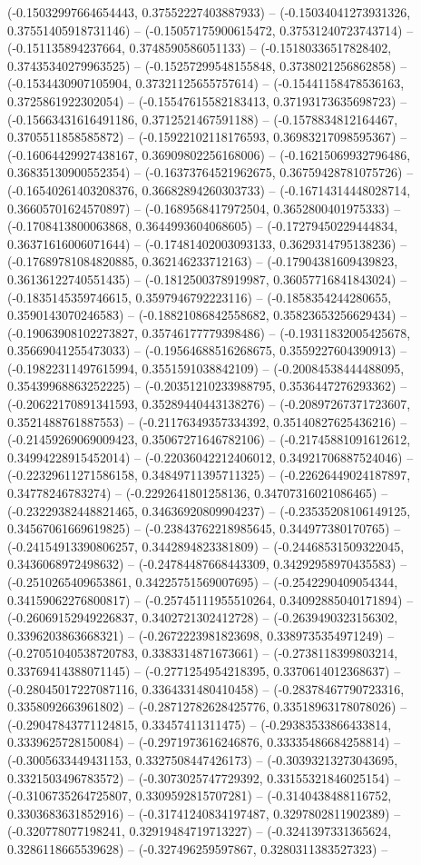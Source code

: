 (-0.15032997664654443, 0.37552227403887933) -- (-0.15034041273931326, 0.37551405918731146) -- (-0.15057175900615472, 0.37531240723743714) -- (-0.151135894237664, 0.3748590586051133) -- (-0.15180336517828402, 0.37435340279963525) -- (-0.15257299548155848, 0.3738021256862858) -- (-0.1534430907105904, 0.37321125655757614) -- (-0.15441158478536163, 0.3725861922302054) -- (-0.15547615582183413, 0.37193173635698723) -- (-0.15663431616491186, 0.3712521467591188) -- (-0.1578834812164467, 0.3705511858585872) -- (-0.15922102118176593, 0.36983217098595367) -- (-0.16064429927438167, 0.36909802256168006) -- (-0.16215069932796486, 0.36835130900552354) -- (-0.16373764521962675, 0.36759428781075726) -- (-0.16540261403208376, 0.36682894260303733) -- (-0.16714314448028714, 0.36605701624570897) -- (-0.1689568417972504, 0.3652800401975333) -- (-0.1708413800063868, 0.3644993604068605) -- (-0.17279450229444834, 0.36371616006071644) -- (-0.17481402003093133, 0.3629314795138236) -- (-0.17689781084820885, 0.362146233712163) -- (-0.17904381609439823, 0.36136122740551435) -- (-0.1812500378919987, 0.36057716841843024) -- (-0.1835145359746615, 0.3597946792223116) -- (-0.1858354244280655, 0.3590143070246583) -- (-0.18821086842558682, 0.35823653256629434) -- (-0.19063908102273827, 0.35746177779398486) -- (-0.19311832005425678, 0.35669041255473033) -- (-0.19564688516268675, 0.3559227604390913) -- (-0.19822311497615994, 0.3551591038842109) -- (-0.20084538444488095, 0.35439968863252225) -- (-0.20351210233988795, 0.3536447276293362) -- (-0.20622170891341593, 0.35289440443138276) -- (-0.20897267371723607, 0.3521488761887553) -- (-0.21176349357334392, 0.35140827625436216) -- (-0.21459269069009423, 0.35067271646782106) -- (-0.21745881091612612, 0.34994228915452014) -- (-0.22036042212406012, 0.34921706887524046) -- (-0.22329611271586158, 0.34849711395711325) -- (-0.22626449024187897, 0.34778246783274) -- (-0.2292641801258136, 0.34707316021086465) -- (-0.23229382448821465, 0.34636920809904237) -- (-0.23535208106149125, 0.34567061669619825) -- (-0.23843762218985645, 0.344977380170765) -- (-0.24154913390806257, 0.3442894823381809) -- (-0.24468531509322045, 0.3436068972498632) -- (-0.24784487668443309, 0.34292958970435583) -- (-0.2510265409653861, 0.34225751569007695) -- (-0.2542290409054344, 0.34159062276800817) -- (-0.25745111955510264, 0.34092885040171894) -- (-0.26069152949226837, 0.3402721302412728) -- (-0.2639490323156302, 0.3396203863668321) -- (-0.2672223981823698, 0.3389735354971249) -- (-0.27051040538720783, 0.3383314871673661) -- (-0.2738118399803214, 0.33769414388071145) -- (-0.2771254954218395, 0.3370614012368637) -- (-0.28045017227087116, 0.3364331480410458) -- (-0.28378467790723316, 0.3358092663961802) -- (-0.28712782628425776, 0.33518963178078026) -- (-0.29047843771124815, 0.33457411311475) -- (-0.29383533866433814, 0.3339625728150084) -- (-0.2971973616246876, 0.33335486684258814) -- (-0.3005633449431153, 0.3327508447426173) -- (-0.30393213273043695, 0.3321503496783572) -- (-0.3073025747729392, 0.33155321846025154) -- (-0.3106735264725807, 0.3309592815707281) -- (-0.3140438488116752, 0.3303683631852916) -- (-0.31741240834197487, 0.3297802811902389) -- (-0.320778077198241, 0.32919484719713227) -- (-0.3241397331365624, 0.3286118665539628) -- (-0.327496259597867, 0.3280311383527323) -- 